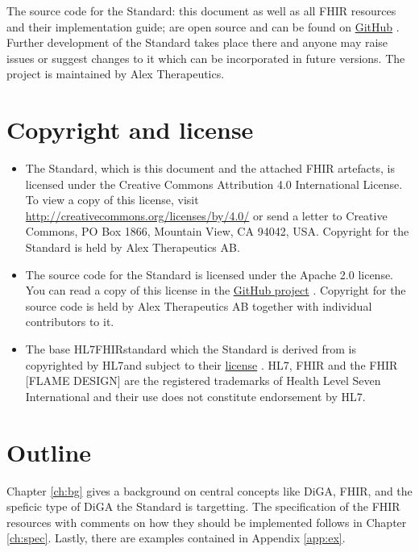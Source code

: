 \documentclass[12px]{report}
\newcommand{\fhir}{FHIR\textsuperscript{\textregistered}}
\newcommand{\hl}{HL7\textsuperscript{\textregistered}}
\begin{document}
The source code for the Standard: this document as well as all FHIR resources and their implementation guide; are open source and can be 
found on \href{https://github.com/alex-therapeutics/diga-nicotine-usage-fhir}{GitHub} \cite{github}. Further development of the Standard
takes place there and anyone may raise issues or suggest changes to it which can be incorporated in future versions.
The project is maintained by Alex Therapeutics.

\section{Copyright and license}

\begin{itemize}
    \item The Standard, which is this document and the attached FHIR artefacts, is licensed under the Creative Commons Attribution 4.0 International License. 
To view a copy of this license, visit \href{http://creativecommons.org/licenses/by/4.0/}{http://creativecommons.org/licenses/by/4.0/} or send a letter to Creative Commons, PO Box 1866, Mountain View, CA 94042, USA.
Copyright for the Standard is held by Alex Therapeutics AB. 
    \item The source code for the Standard is licensed under the Apache 2.0 license. 
You can read a copy of this license in the \href{https://github.com/alex-therapeutics/diga-nicotine-usage-fhir/blob/main/LICENSE}{GitHub project} \cite{github}.
Copyright for the source code is held by Alex Therapeutics AB together with individual contributors to it.
    \item The base \hl \fhir standard which the Standard is derived from is copyrighted by \hl and subject to their \href{http://hl7.org/fhir/license.html}{license} \cite{fhirlic}.
HL7, FHIR and the FHIR [FLAME DESIGN] are the registered trademarks of Health Level Seven International and their use does not constitute endorsement by HL7.
\end{itemize}

\section{Outline}
Chapter \ref{ch:bg} gives a background on central concepts like DiGA, FHIR, and the speficic type of DiGA the Standard is targetting. The specification of the FHIR resources with comments on how they should be implemented follows in Chapter \ref{ch:spec}.
Lastly, there are examples contained in Appendix \ref{app:ex}.
\end{document}
